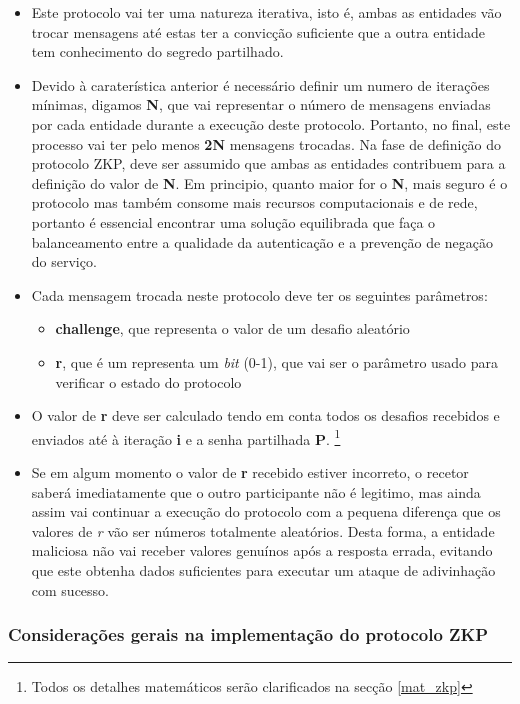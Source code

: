 \begin{itemize}
    \item Este protocolo vai ter uma natureza iterativa, isto é, ambas as entidades vão trocar mensagens até estas ter a convicção suficiente que a outra entidade tem conhecimento do segredo partilhado.
    \item Devido à caraterística anterior é necessário definir um numero de iterações mínimas, digamos \textbf{N}, que vai representar o número de mensagens enviadas por cada entidade durante a execução deste protocolo. Portanto, no final, este processo vai ter pelo menos \textbf{2N} mensagens trocadas. Na fase de definição do protocolo ZKP, deve ser assumido que ambas as entidades contribuem para a definição do valor de \textbf{N}. Em principio, quanto maior for o \textbf{N}, mais seguro é o protocolo mas também consome mais recursos computacionais e de rede, portanto é essencial encontrar uma solução equilibrada que faça o balanceamento entre a qualidade da autenticação e a prevenção de negação do serviço.
    \item Cada mensagem trocada neste protocolo deve ter os seguintes parâmetros:
    \begin{itemize}
        \item \textbf{challenge}, que representa o valor de um desafio aleatório
        \item \textbf{r}, que é um representa um \textit{bit} (0-1), que vai ser o parâmetro usado para verificar o estado do protocolo
    \end{itemize}
    \item O valor de \textbf{r} deve ser calculado tendo em conta todos os desafios recebidos e enviados até à iteração \textbf{i} e a senha partilhada \textbf{P}. \footnote{Todos os detalhes matemáticos serão clarificados na secção \ref{mat_zkp}}
    \item Se em algum momento o valor de \textbf{r} recebido estiver incorreto, o recetor saberá imediatamente que o outro participante não é legitimo, mas ainda assim vai continuar a execução do protocolo com a pequena diferença que os valores de  \textit{r} vão ser números totalmente aleatórios. Desta forma, a entidade maliciosa não vai receber valores genuínos após a resposta errada, evitando que este obtenha dados suficientes para executar um ataque de adivinhação com sucesso.
\end{itemize}

\subsubsection{Considerações gerais na implementação do protocolo ZKP}

